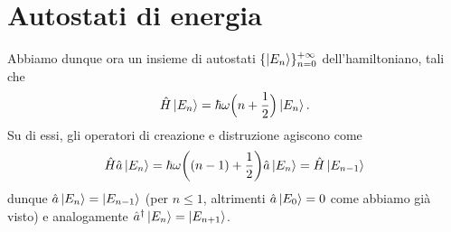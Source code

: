 \section{Autostati di energia}
Abbiamo dunque ora un insieme di autostati $\{\left|{E_n}\right\rangle\}_{n=0}^{+\infty}$ dell'hamiltoniano, tali che
\begin{equation}
	\hat{H}\left|{E_n}\right\rangle=\hbar\omega\Big(n+\frac12\Big)\left|{E_n}\right\rangle.
\end{equation}
Su di essi, gli operatori di creazione e distruzione agiscono come
\begin{equation}
	\hat{H}\hat{a}\left|{E_n}\right\rangle=\hbar\omega\bigg((n-1)+\frac12\bigg)\hat{a}\left|{E_n}\right\rangle=\hat{H}\left|{E_{n-1}}\right\rangle
\end{equation}
dunque $\hat{a}\left|{E_n}\right\rangle=\left|{E_{n-1}}\right\rangle$ (per $n\le 1$, altrimenti $\hat{a}\left|{E_0}\right\rangle=0$ come abbiamo già visto) e analogamente ${\hat{a}}^\dagger\left|{E_n}\right\rangle=\left|{E_{n+1}}\right\rangle$.

